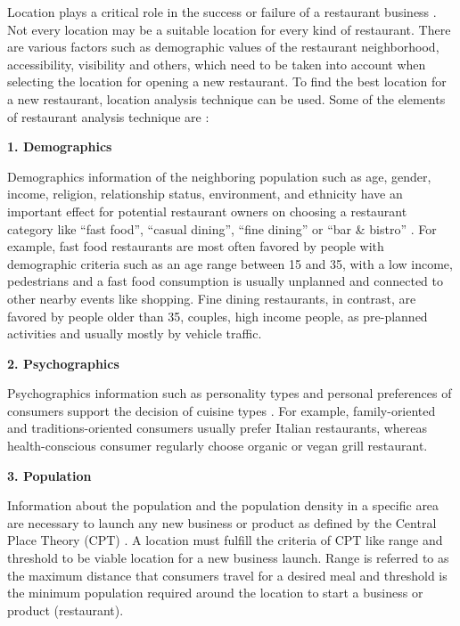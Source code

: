 \documentclass[a4paper, 11pt, oneside]{Thesis}  %
\begin{document}
Location plays a critical role in the success or failure of a restaurant business \cite{Tzeng.2002} \cite{Parsa.2005} \cite{Camillo.2008}. Not every location may be a suitable location for every kind of restaurant. There are various factors such as demographic values of the restaurant neighborhood, accessibility, visibility and others, which need to be taken into account when selecting the location for opening a new restaurant. To find the best location for a new restaurant, location analysis technique can be used. Some of the elements of restaurant analysis technique are \cite{EvanTarver.21.04.2017}\cite{Webstaurantstore.com.25.07.2018}:


 \textbf{1.	Demographics}

Demographics information of the neighboring population such as age, gender, income, religion, relationship status, environment, and ethnicity have an important effect for potential restaurant owners on choosing a restaurant category like “fast food”, “casual dining”, “fine dining” or “bar \& bistro” \cite{EvanTarver.21.04.2017}. For example, fast food restaurants are most often favored by people with demographic criteria such as an age range between 15 and 35, with a low income, pedestrians and a fast food consumption is usually unplanned and connected to other nearby events like shopping. Fine dining restaurants, in contrast, are favored by people older than 35, couples, high income people, as pre-planned activities and usually mostly by vehicle traffic.

\textbf{2.	Psychographics}

Psychographics information such as personality types and personal preferences of consumers support the decision of cuisine types \cite{EvanTarver.21.04.2017}. For example, family-oriented and traditions-oriented consumers usually prefer Italian restaurants, whereas health-conscious consumer regularly choose organic or vegan grill restaurant. 

\textbf{3.	Population}

Information about the population and the population density in a specific area are necessary to launch any new business or product as defined by the Central Place Theory (CPT) \cite{Chen.2016}. A location must fulfill the criteria of CPT like range and threshold to be viable location for a new business launch. Range is referred to as the maximum distance that consumers travel for a desired meal and threshold is the minimum population required around the location to start a business or product (restaurant).
\end{document}

